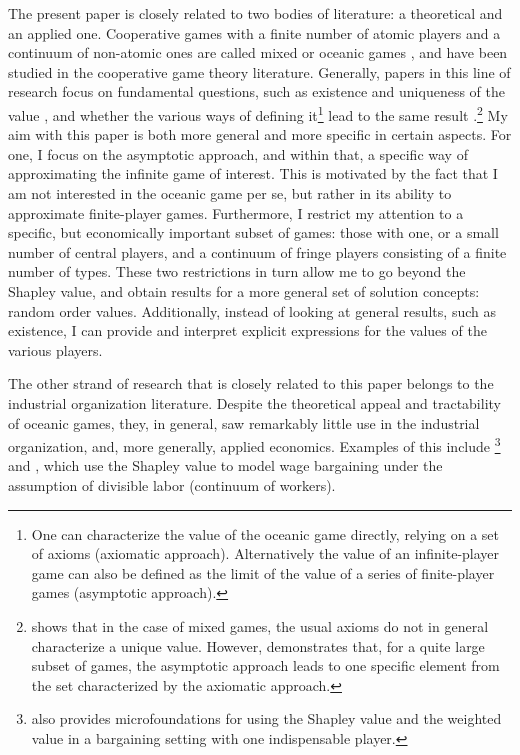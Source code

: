 \documentclass[a4paper]{article}
\begin{document}
The present paper is closely related to two bodies of literature: a theoretical and an applied one.
Cooperative games with a finite number of atomic players and a continuum of non-atomic ones are called mixed or oceanic games \parencite{milnor1978values}, and have been studied in the cooperative game theory literature.
Generally, papers in this line of research focus on fundamental questions, such as existence and uniqueness of the value \parencite{hart1973values}, and whether the various ways of defining it\footnote{
    One can characterize the value of the oceanic game directly, relying on a set of axioms (axiomatic approach). Alternatively the value of an infinite-player game can also be defined as the limit of the value of a series of finite-player games (asymptotic approach).
} lead to the same result \parencite{fogelman1980asymptotic}.\footnote{
    \textcite{hart1973values} shows that in the case of mixed games, the usual axioms do not in general characterize a unique value.
    However, \textcite{fogelman1980asymptotic} demonstrates that, for a quite large subset of games, the asymptotic approach leads to one specific element from the set characterized by the axiomatic approach. 
}
My aim with this paper is both more general and more specific in certain aspects.
For one, I focus on the asymptotic approach, and within that, a specific way of approximating the infinite game of interest.
This is motivated by the fact that I am not interested in the oceanic game per se, but rather in its ability to approximate finite-player games.
Furthermore, I restrict my attention to a specific, but economically important subset of games: those with one, or a small number of central players, and a continuum of fringe players consisting of a finite number of types.
These two restrictions in turn allow me to go beyond the Shapley value, and obtain results for a more general set of solution concepts: random order values.
Additionally, instead of looking at general results, such as existence, I can provide and interpret explicit expressions for the values of the various players.

The other strand of research that is closely related to this paper belongs to the industrial organization literature.
Despite the theoretical appeal and tractability of oceanic games, they, in general, saw remarkably little use in the industrial organization, and, more generally, applied economics.
Examples of this include \textcite{stole1996intra, stole1996organizational}\footnote{
    \textcite{stole1996intra} also provides microfoundations for using the Shapley value and the weighted value in a bargaining setting with one indispensable player.
} and \textcite{levy1997individual}, which use the Shapley value to model wage bargaining under the assumption of divisible labor (continuum of workers).
\end{document}
